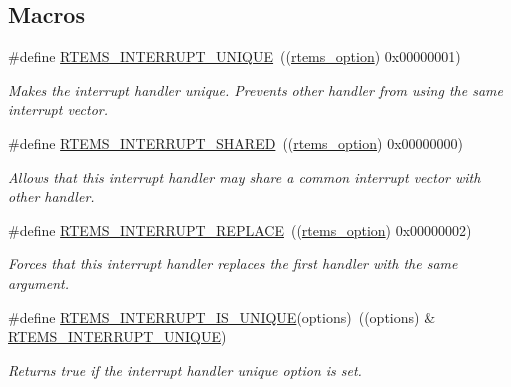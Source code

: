 \subsection*{Macros}
\begin{DoxyCompactItemize}
\item 
\#define \mbox{\hyperlink{group__rtems__interrupt__extension_ga5f61e9433b266894801af5ed9992efac}{R\+T\+E\+M\+S\+\_\+\+I\+N\+T\+E\+R\+R\+U\+P\+T\+\_\+\+U\+N\+I\+Q\+UE}}~((\mbox{\hyperlink{group__ClassicOptions_gad26685eb0e60a9650082935c31920e29}{rtems\+\_\+option}}) 0x00000001)
\begin{DoxyCompactList}\small\item\em Makes the interrupt handler unique. Prevents other handler from using the same interrupt vector. \end{DoxyCompactList}\item 
\#define \mbox{\hyperlink{group__rtems__interrupt__extension_ga4ef5d96798d52439c7836596650f7d98}{R\+T\+E\+M\+S\+\_\+\+I\+N\+T\+E\+R\+R\+U\+P\+T\+\_\+\+S\+H\+A\+R\+ED}}~((\mbox{\hyperlink{group__ClassicOptions_gad26685eb0e60a9650082935c31920e29}{rtems\+\_\+option}}) 0x00000000)
\begin{DoxyCompactList}\small\item\em Allows that this interrupt handler may share a common interrupt vector with other handler. \end{DoxyCompactList}\item 
\#define \mbox{\hyperlink{group__rtems__interrupt__extension_gaca2eb7f8caa5eda72bd6924ee4c8e5d3}{R\+T\+E\+M\+S\+\_\+\+I\+N\+T\+E\+R\+R\+U\+P\+T\+\_\+\+R\+E\+P\+L\+A\+CE}}~((\mbox{\hyperlink{group__ClassicOptions_gad26685eb0e60a9650082935c31920e29}{rtems\+\_\+option}}) 0x00000002)
\begin{DoxyCompactList}\small\item\em Forces that this interrupt handler replaces the first handler with the same argument. \end{DoxyCompactList}\item 
\#define \mbox{\hyperlink{group__rtems__interrupt__extension_ga2058eb9a90d813aced09c21a4ce61829}{R\+T\+E\+M\+S\+\_\+\+I\+N\+T\+E\+R\+R\+U\+P\+T\+\_\+\+I\+S\+\_\+\+U\+N\+I\+Q\+UE}}(options)~((options) \& \mbox{\hyperlink{group__rtems__interrupt__extension_ga5f61e9433b266894801af5ed9992efac}{R\+T\+E\+M\+S\+\_\+\+I\+N\+T\+E\+R\+R\+U\+P\+T\+\_\+\+U\+N\+I\+Q\+UE}})
\begin{DoxyCompactList}\small\item\em Returns true if the interrupt handler unique option is set. \end{DoxyCompactList}\item 

\end{DoxyCompactItemize}
